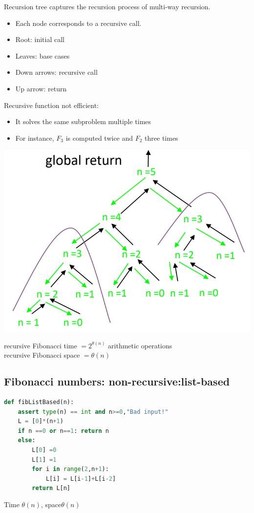 \documentclass[12pt,oneside]{book}
\begin{document}
Recursion tree captures the recursion process of multi-way recursion.
\begin{itemize}
	\item Each node corresponds to a recursive call.
	\item Root: initial call
	\item Leaves: base cases
	\item Down arrows: recursive call
	\item Up arrow: return
\end{itemize}
\begin{minipage}{0.7\linewidth}
	Recursive function not efficient:
	\begin{itemize}
		\item It solves the same subproblem multiple times
		\item For instance, $F_3$ is computed twice and $F_2$ three times
	\end{itemize}
\end{minipage}
\begin{minipage}{0.3\linewidth}
	\includegraphics[width=\linewidth]{../pic/python/9}
\end{minipage}
recursive Fibonacci time $ = 2^{\theta(n)}$ arithmetic operations\\
recursive Fibonacci space $ = \theta(n)$
\subsection{Fibonacci numbers: non-recursive:list-based}
{\small\begin{lstlisting}[language=python]
def fibListBased(n):
    assert type(n) == int and n>=0,"Bad input!"
    L = [0]*(n+1)
    if n ==0 or n==1: return n 
    else:
        L[0] =0 
        L[1] =1 
        for i in range(2,n+1):
            L[i] = L[i-1]+L[i-2]
        return L[n]
\end{lstlisting}}
Time $\theta(n)$, space$\theta(n)$
\end{document}

